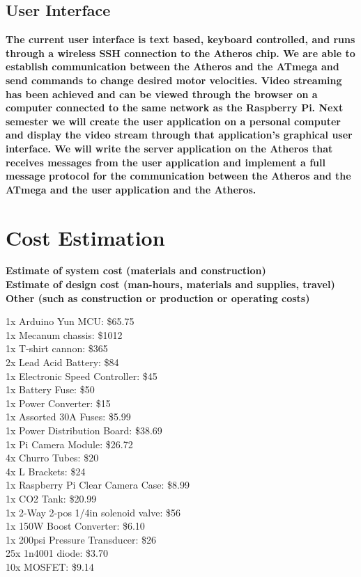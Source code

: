 \documentclass[letterpaper,12pt]{article}
\newcommand{\xxx}[1]{{\color{red}\bf #1}}
\begin{document}
\subsection{User Interface}
\xxx{The current user interface is text based, keyboard controlled, and runs
through a wireless SSH connection to the Atheros chip. We are able to establish
communication between the Atheros and the ATmega and send commands to change
desired motor velocities. Video streaming has been achieved and can be viewed
through the browser on a computer connected to the same network as the
Raspberry Pi. Next semester we will create the user application on a personal
computer and display the video stream through that application’s graphical user
interface. We will write the server application on the Atheros that receives
messages from the user application and implement a full message protocol for
the communication between the Atheros and the ATmega and the user application
and the Atheros.}\\

\section{Cost Estimation}
\xxx{Estimate of system cost (materials and construction)} \\
\xxx{Estimate of design cost (man-hours, materials and supplies, travel)} \\
\xxx{Other (such as construction or production or operating costs)}

\label{sec:cost}
1x Arduino Yun MCU: \$65.75 \\
1x Mecanum chassis: \$1012 \\
1x T-shirt cannon: \$365 \\
2x Lead Acid Battery: \$84 \\
1x Electronic Speed Controller: \$45 \\
1x Battery Fuse: \$50 \\
1x Power Converter: \$15 \\
1x Assorted 30A Fuses: \$5.99 \\
1x Power Distribution Board: \$38.69 \\
1x Pi Camera Module: \$26.72 \\
4x Churro Tubes: \$20 \\
4x L Brackets: \$24 \\
1x Raspberry Pi Clear Camera Case: \$8.99 \\
1x CO2 Tank: \$20.99 \\
1x 2-Way 2-pos 1/4in solenoid valve: \$56 \\
1x 150W Boost Converter: \$6.10 \\
1x 200psi Pressure Transducer: \$26 \\
25x 1n4001 diode: \$3.70 \\
10x MOSFET: \$9.14 \\
\end{document}
